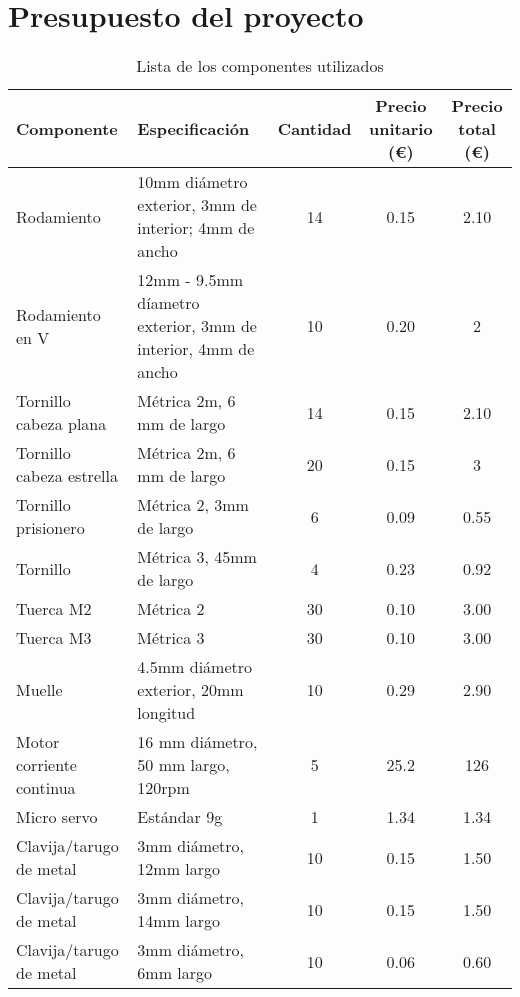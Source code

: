 


\chapter{Presupuesto del proyecto} %
\label{presupuestoProyecto}

\pagestyle{empty}

\begin{landscape}

\begin{table}
\caption{Lista de los componentes utilizados}
\label{tab:presupuesto}
\centering

\begin{tabular}{l l c c c}
\toprule
\textbf{Componente} & \textbf{Especificación} & \textbf{Cantidad} & \textbf{Precio unitario (\euro)} & \textbf{Precio total (\euro)} \\
\midrule
 Rodamiento                 & 10mm diámetro exterior, 3mm de interior; 4mm de ancho & 14  & 0.15 & 2.10 \\
 Rodamiento en V            & 12mm - 9.5mm díametro exterior, 3mm de interior, 4mm de ancho & 10 & 0.20 & 2 \\
 Tornillo cabeza plana      & Métrica 2m, 6 mm de largo & 14  & 0.15 & 2.10 \\
 Tornillo cabeza estrella   & Métrica 2m, 6 mm de largo & 20  & 0.15 & 3 \\
 Tornillo prisionero        & Métrica 2, 3mm de largo & 6 & 0.09 & 0.55 \\
 Tornillo                   & Métrica 3, 45mm de largo & 4 & 0.23 & 0.92 \\
 Tuerca M2                  & Métrica 2  &  30  & 0.10 & 3.00 \\
 Tuerca M3                  & Métrica 3  &  30  & 0.10 & 3.00 \\
 Muelle                     & 4.5mm diámetro exterior, 20mm longitud &  10  &  0.29  &  2.90 \\
 Motor corriente continua   & 16 mm diámetro, 50 mm largo, 120rpm & 5 & 25.2 & 126  \\
 Micro servo                & Estándar 9g & 1 & 1.34 & 1.34 \\
 Clavija/tarugo de metal    & 3mm diámetro, 12mm largo & 10  &  0.15 & 1.50  \\
 Clavija/tarugo de metal    & 3mm diámetro, 14mm largo & 10  &  0.15 & 1.50  \\
 Clavija/tarugo de metal    & 3mm diámetro, 6mm largo &  10  &  0.06 & 0.60  \\

\end{tabular}
\end{table}
\end{landscape}
